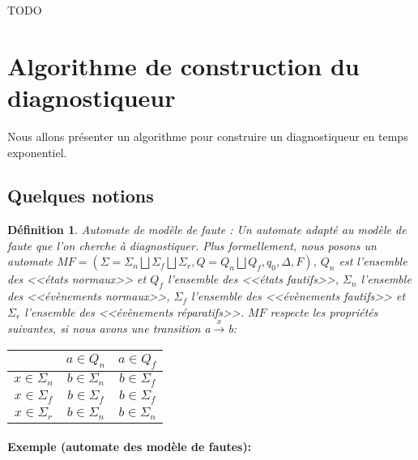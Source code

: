 \documentclass[10pt,a4paper]{article}
\newtheorem {mydef} {D\'efinition}
\begin{document}
TODO

\section{Algorithme de construction du diagnostiqueur}
    Nous allons présenter un algorithme pour construire un diagnostiqueur en temps exponentiel.
        \subsection{Quelques notions}
   \begin{mydef}{Automate de mod\`ele de faute : }
                Un automate adapté au modèle de faute que l'on cherche à diagnostiquer. Plus formellement, nous posons un automate $MF = (\Sigma = \Sigma_n \bigsqcup \Sigma_f \bigsqcup \Sigma_r, Q = Q_n \bigsqcup Q_f,q_0,\Delta, F)$,  $Q_n$ est l'ensemble des <<\'etats normaux>> et $Q_f$ l'ensemble des <<\'etats fautifs>>, $\Sigma_n$  l'ensemble des <<\'ev\`enements normaux>>, $\Sigma_f$ l'ensemble des  <<\'ev\`enements fautifs>> et $\Sigma_r$ l'ensemble des <<\'ev\`enements r\'eparatifs>>. $MF$ respecte les propri\'et\'es suivantes, si nous avons une transition a$\xrightarrow{x}$b:
                \begin{center}
                \begin{tabular}{|c|c|c|}
                        \hline
                        & $a\in Q_n$ & $a\in Q_f$\\
                        \hline                        
                        $x\in \Sigma_n$ & $b\in \Sigma_n$&$b\in \Sigma_f$\\
                        \hline                        
                        $x\in \Sigma_f$ &$b\in \Sigma_f$&$b\in \Sigma_f$\\
                        \hline
                        $x\in \Sigma_r$ & $b\in \Sigma_n$ & $b \in \Sigma_n$\\
                        \hline
                \end{tabular}
                \end{center}
    \end{mydef}
    
    \paragraph{Exemple (automate des mod\`ele de fautes): } %
    
\end{document}
